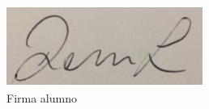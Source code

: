 \begin{figure}[!bt]
    \centering
    \includegraphics[scale=0.6]{images/miFirma.png}
    \caption{Firma alumno}
    \label{Fig:miFirma}
\end{figure}

